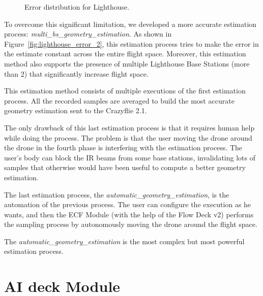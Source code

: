 \begin{figure}[h]
    \centering
    \qquad
    \caption{Error distribution for Lighthouse.}\label{fig:lighthouse_error}
\end{figure}

To overcome this significant limitation, we developed a more accurate estimation process: \textit{multi\_bs\_geometry\_estimation}. 
As shown in Figure~\ref{fig:lighthouse_error_2}, this estimation process tries to make the error in the estimate constant across the entire flight space. 
Moreover, this estimation method also supports the presence of multiple Lighthouse Base Stations (more than 2) that significantly increase flight space.

This estimation method consists of multiple executions of the first estimation process.
All the recorded samples are averaged to build the most accurate geometry estimation sent to the Crazyflie 2.1.


The only drawback of this last estimation process is that it requires human help while doing the process. 
The problem is that the user moving the drone around the drone in the fourth phase is interfering with the estimation process. 
The user's body can block the IR beams from some base stations, invalidating lots of samples that otherwise would have been useful to compute a better geometry estimation.

The last estimation process, the \textit{automatic\_geometry\_estimation}, is the automation of the previous process. 
The user can configure the execution as he wants, and then the ECF Module (with the help of the Flow Deck v2) performs the sampling process by autonomously moving the drone around the flight space.

The \textit{automatic\_geometry\_estimation} is the most complex but most powerful estimation process.

\section{AI deck Module}\label{sec:module_ai_deck}


